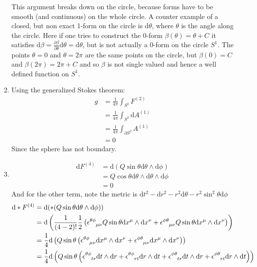 \documentclass[12pt,a4]{article}
\newcommand{\e}{\mathrm{d}}
\begin{document}
\begin{enumerate}
\begin{enumerate}
        This argument breaks down on the circle, because forms have to be smooth (and continuous) on the whole circle.
        A counter example of a closed, but non exact 1-form on the circle is $\e \theta$, where $\theta$ is the angle along the circle.
        Here if one tries to construct the 0-form $\beta(\theta) = \theta + C$ it satisfies $\e \beta = \frac{\partial \beta}{\partial \theta} \e \theta = \e \theta$, but is not actually a 0-form on the circle $S^1$.
        The points $\theta = 0$ and $\theta = 2 \pi$ are the same points on the circle, but $\beta(0) = C$ and $\beta(2 \pi) = 2 \pi + C$ and so $\beta$ is not single valued and hence a well defined function on $S^1$.
      \item
        Using the generalized Stokes theorem:
        \begin{align*}
          g &= \frac{1}{4 \pi } \int_{S^2} F^{(2)} \\
            &= \frac{1}{4 \pi } \int_{S^2} \e A^{(1)} \\
            &= \frac{1}{4 \pi } \int_{\partial S^2} A^{(1)} \\
            &= 0 
        \end{align*}
        Since the sphere has not boundary.
      \item
        \begin{align*}
          \e F^{(4)} &= \e (Q \sin \theta \e \theta \wedge \e \phi)\\
                     &= Q \cos \theta \e \theta \wedge \e \theta \wedge \e \phi\\
                     &= 0 
        \end{align*}
        And for the other term, note the metric is $\e t^2 - \e r^2 - r^2 \e \theta - r^2 \sin^2 \theta \e \phi$
        \begin{align*}
          \e * F^{(4)} &= \e (* (Q \sin \theta \e \theta \wedge \e \phi))\\
                       &= \e \left(\frac{1}{(4 - 2)!}\frac{1}{2} \left(\tensor{\epsilon}{^\theta ^\phi_\mu_\nu} Q \sin \theta \e x^\mu \wedge \e x^\nu + \tensor{\epsilon}{^\phi^\theta _\mu_\nu} Q \sin \theta \e x^\mu \wedge \e x^\nu\right)\right)\\
                       &= \frac{1}{4}\e \left(Q \sin \theta \left(\tensor{\epsilon}{^\theta ^\phi_\mu_\nu}  \e x^\mu \wedge \e x^\nu + \tensor{\epsilon}{^\phi^\theta _\mu_\nu} \e x^\mu \wedge \e x^\nu\right)\right)\\
                       &= \frac{1}{4}\e \left(Q \sin \theta \left( \tensor{\epsilon}{^\theta ^\phi_t_r} \e t \wedge \e r + \tensor{\epsilon}{^\theta ^\phi_r_t} \e r \wedge \e t + \tensor{\epsilon}{^\phi^\theta _t_r} \e t \wedge \e r + \tensor{\epsilon}{^\phi^\theta _r_t} \e r \wedge \e t\right)\right)

\end{align*}
\end{enumerate}
\end{enumerate}
\end{document}
